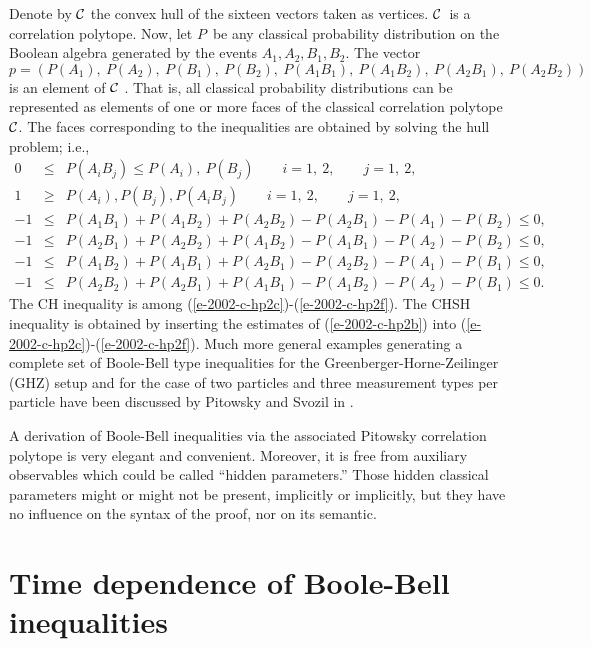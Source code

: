 \documentclass{epl}
\begin{document}
Denote by ${\cal C}$ the convex
hull of the sixteen
vectors taken as vertices. ${\cal C}$\ is a correlation polytope. Now, let
$P$\ be any classical probability
distribution on the Boolean algebra generated by the events $
A_{1},A_{2},B_{1},B_{2} $.
The vector $
p=(P(A_{1}),\ P(A_{2}),\ P(B_{1}),\ P(B_{2}),\ P(A_{1}B_{1}),\
P(A_{1}B_{2}),\ P(A_{2}B_{1}),\ P(A_{2}B_{2}))$
is an element of ${\cal C}$ \cite[pp. 28-29]{pitowsky}.
That is, all classical probability distributions can be represented as
elements of one or more faces of the classical correlation polytope ${\cal C}$.
The faces corresponding to the inequalities are obtained by solving the hull problem; i.e.,
\begin{eqnarray}
0&\leq & P(A_{i}B_{j})\leq P(A_{i}),\ P(B_{j}) \qquad  i=1,\ 2,\qquad  j=1,\ 2,
\label{e-2002-c-hp2a} \\
1&\geq & P(A_{i}), P(B_{j}),P(A_{i}B_{j})\qquad i=1,\ 2,\qquad j=1,\ 2,
\label{e-2002-c-hp2b} \\
-1&\leq& P(A_{1}B_{1})+P(A_{1}B_{2})+P(A_{2}B_{2})-P(A_{2}B_{1})-P(A_{1})-P(B_{2}) \leq 0,
\label{e-2002-c-hp2c} \\
-1&\leq&  P(A_{2}B_{1})+P(A_{2}B_{2})+P(A_{1}B_{2})-P(A_{1}B_{1})-P(A_{2})-P(B_{2})\leq 0,
\label{e-2002-c-hp2d} \\
-1&\leq&  P(A_{1}B_{2})+P(A_{1}B_{1})+P(A_{2}B_{1})-P(A_{2}B_{2})-P(A_{1})-P(B_{1})\leq 0,
\label{e-2002-c-hp2e} \\
-1&\leq&  P(A_{2}B_{2})+P(A_{2}B_{1})+P(A_{1}B_{1})-P(A_{1}B_{2})-P(A_{2})-P(B_{1})\leq 0.
\label{e-2002-c-hp2f}
\end{eqnarray}
The CH inequality is among
(\ref{e-2002-c-hp2c})-(\ref{e-2002-c-hp2f}).
The CHSH
inequality is obtained by inserting the estimates of (\ref{e-2002-c-hp2b})
into
(\ref{e-2002-c-hp2c})-(\ref{e-2002-c-hp2f}).
Much more general examples generating a complete set of Boole-Bell type
inequalities for the Greenberger-Horne-Zeilinger (GHZ) setup and for
the case of two particles and three measurement types per particle
have been discussed by Pitowsky and Svozil in \cite{2000-poly}.

A derivation of Boole-Bell  inequalities
via the associated Pitowsky correlation polytope
is very elegant and convenient.
Moreover, it is free from auxiliary observables
which could be called ``hidden parameters.''
Those hidden classical parameters might or might not be present,
implicitly or implicitly,
but they have no influence on the syntax of the proof, nor on its semantic.


\section{Time dependence of Boole-Bell inequalities}
\end{document}
